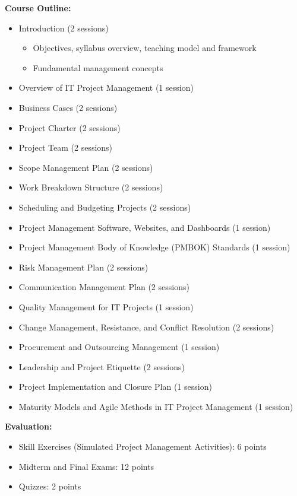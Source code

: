 \documentclass[12pt]{article}
\begin{document}
\textbf{Course Outline:}
\begin{itemize}
    \item Introduction (2 sessions)
    \begin{itemize}
        \item Objectives, syllabus overview, teaching model and framework
        \item Fundamental management concepts
    \end{itemize}
    \item Overview of IT Project Management (1 session)
    \item Business Cases (2 sessions)
    \item Project Charter (2 sessions)
    \item Project Team (2 sessions)
    \item Scope Management Plan (2 sessions)
    \item Work Breakdown Structure (2 sessions)
    \item Scheduling and Budgeting Projects (2 sessions)
    \item Project Management Software, Websites, and Dashboards (1 session)
    \item Project Management Body of Knowledge (PMBOK) Standards (1 session)
    \item Risk Management Plan (2 sessions)
    \item Communication Management Plan (2 sessions)
    \item Quality Management for IT Projects (1 session)
    \item Change Management, Resistance, and Conflict Resolution (2 sessions)
    \item Procurement and Outsourcing Management (1 session)
    \item Leadership and Project Etiquette (2 sessions)
    \item Project Implementation and Closure Plan (1 session)
    \item Maturity Models and Agile Methods in IT Project Management (1 session)
\end{itemize}

\textbf{Evaluation:}
\begin{itemize}
    \item Skill Exercises (Simulated Project Management Activities): 6 points
    \item Midterm and Final Exams: 12 points
    \item Quizzes: 2 points
\end{itemize}
\end{document}
